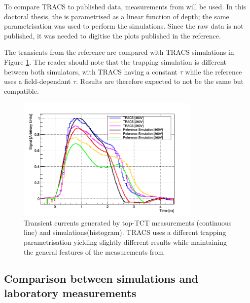 To compare TRACS to published data, measurements from \cite{Pholsen} will be used. In this doctoral thesis, the \neff is parametrised as a linear function of depth; the same parametrisation was used to perform the simulations. Since the raw data is not published, it was needed to digitise the plots published in the reference.
%

The transients from the reference are compared with TRACS simulations in Figure \ref{fig:PholsenTransient}.  The reader should note that the trapping simulation is different between both simulators, with TRACS having a constant $\tau$ while the reference uses a field-dependant $\tau$. Results are therefore expected to not be the same but compatible.

\begin{figure}[H]
	\centering
	\includegraphics[width=0.8\textwidth]{Pohlsen_scr.png}
	\caption{Transient currents generated by top-TCT measurements (continuous line) and simulations(histogram). TRACS uses a different trapping parametrisation yielding slightly different results while maintaining the general features of the measurements from \cite{Pholsen}}
	\label{fig:PholsenTransient}
\end{figure}


\subsection{Comparison between simulations and laboratory measurements}

